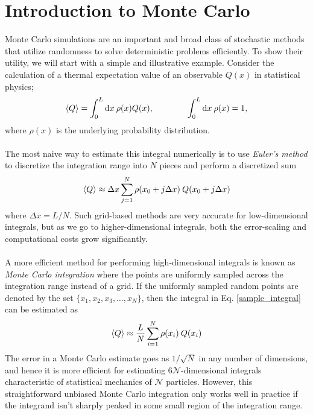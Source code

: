 \documentclass[../thesis_main.tex]{subfiles}
\begin{document}
\section{Introduction to Monte Carlo}
Monte Carlo simulations are an important and broad class of stochastic methods that utilize randomness to solve deterministic problems efficiently. To show their utility, we will start with a simple and illustrative example. Consider the calculation of a thermal expectation value of an observable $Q(x)$ in statistical physics;
\begin{equation}
    \expval{Q} = \int_0^L \dd x \: \rho(x) Q(x), \qquad \qquad \int_0^L \dd x \: \rho(x) = 1,
    \label{sample_integral}
\end{equation} 
where $\rho(x)$ is the underlying probability distribution.~\\~\\
The most naive way to estimate this integral numerically is to use \textit{Euler's method}  to discretize the integration range into $N$ pieces and perform a discretized sum
\begin{equation}
    \expval{Q} \approx \Delta x \sum_{j=1}^N \rho(x_0 + j \Delta x) \: Q(x_0 + j\Delta x)
\end{equation} 
where $\Delta x = L/N$. Such grid-based methods are very accurate for low-dimensional integrals, but as we go to higher-dimensional integrals, both the error-scaling and computational costs grow significantly.~\\~\\
A more efficient method for performing high-dimensional integrals is known as \textit{Monte Carlo integration} where the points are uniformly sampled across the integration range instead of a grid. If the uniformly sampled random points are denoted by the set $\{x_1, x_2, x_3, \ldots, x_N \}$, then the integral in Eq. \eqref{sample_integral} can be estimated as 
\begin{equation}
    \expval{Q} \approx \frac{L}{N} \sum_{i=1}^N \rho(x_i) \: Q(x_i)
\end{equation} 
The error in a Monte Carlo estimate goes as $1/\sqrt{N}$ in any number of dimensions, and hence it is more efficient for estimating $6 \mathcal{N}$-dimensional integrals characteristic of statistical mechanics of $\mathcal{N}$ particles. However, this straightforward unbiased Monte Carlo integration only works well in practice if the integrand isn't sharply peaked in some small region of the integration range.
\end{document}
